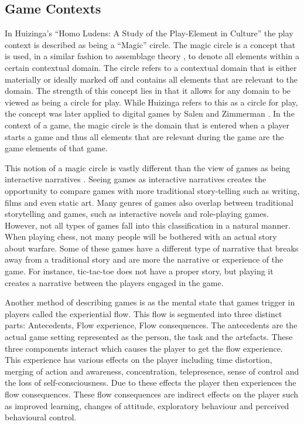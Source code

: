 \documentclass[11pt]{article}
\begin{document}
\subsection{Game Contexts}

In Huizinga's ``Homo Ludens: A Study of the Play-Element in Culture'' \cite{Huizinga} the play context is described as being a ``Magic'' circle. The magic circle is a concept that is used, in a similar fashion to assemblage theory \cite{Taylor2009}, to denote all elements within a certain contextual domain. The circle refers to a contextual domain that is either materially or ideally marked off and contains all elements that are relevant to the domain. The strength of this concept lies in that it allows for any domain to be viewed as being a circle for play. While Huizinga refers to this as a circle for play, the concept was later applied to digital games by Salen and Zimmerman \cite{Zimmerman2004}. In the context of a game, the magic circle is the domain that is entered when a player starts a game and thus all elements that are relevant during the game are the game elements of that game.

This notion of a magic circle is vastly different than the view of games as being interactive narratives \cite{Hartsook2011,Marchiori2011,Li2012,Jenkins2004}. Seeing games as interactive narratives creates the opportunity to compare games with more traditional story-telling such as writing, films and even static art. Many genres of games also overlap between traditional storytelling and games, such as interactive novels and role-playing games. However, not all types of games fall into this classification in a natural manner. When playing chess, not many people will be bothered with an actual story about warfare. Some of these games have a different type of narrative that breaks away from a traditional story and are more the narrative or experience of the game. For instance, tic-tac-toe does not have a proper story, but playing it creates a narrative between the players engaged in the game.

Another method of describing games is as the mental state that games trigger in players \cite{Kiili2005} called the experiential flow. This flow is segmented into three distinct parts: Antecedents, Flow experience, Flow consequences. The antecedents are the actual game setting represented as the person, the task and the artefacts. These three components interact which causes the player to get the flow experience. This experience has various effects on the player including time distortion, merging of action and awareness, concentration, telepresence, sense of control and the loss of self-consciousness. Due to these effects the player then experiences the flow consequences. These flow consequences are indirect effects on the player such as improved learning, changes of attitude, exploratory behaviour and perceived behavioural control.
\end{document}
